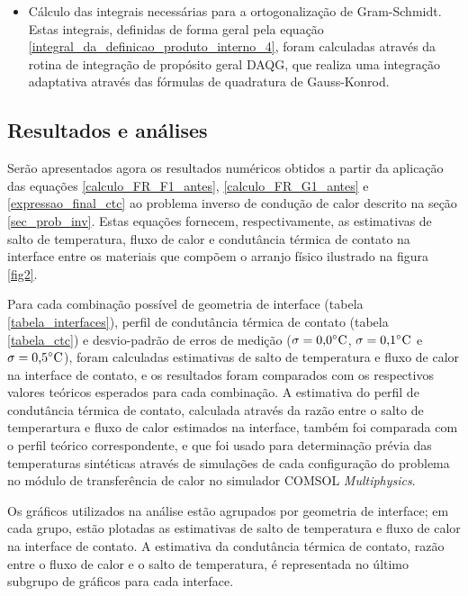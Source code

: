 \begin{itemize}
	\item Cálculo das integrais necessárias para a ortogonalização de Gram-Schmidt. Estas integrais, definidas de forma geral pela equação \eqref{integral_da_definicao_produto_interno_4}, foram calculadas através da rotina de integração de propósito geral DAQG, que realiza uma integração adaptativa através das fórmulas de quadratura de Gauss-Konrod.
\end{itemize}

\subsection{Resultados e análises}

Serão apresentados agora os resultados numéricos obtidos a partir da aplicação das equações \eqref{calculo_FR_F1_antes}, \eqref{calculo_FR_G1_antes} e \eqref{expressao_final_ctc} ao problema inverso de condução de calor descrito na seção \ref{sec_prob_inv}. Estas equações fornecem, respectivamente, as estimativas de salto de temperatura, fluxo de calor e condutância térmica de contato na interface entre os materiais que compõem o arranjo físico ilustrado na figura \ref{fig2}.

Para cada combinação possível de geometria de interface (tabela \ref{tabela_interfaces}), perfil de condutância térmica de contato (tabela \ref{tabela_ctc}) e desvio-padrão de erros de medição ($\sigma = \text{0,0}\celsius$, $\sigma = \text{0,1}\celsius$ e $\sigma = \text{0,5}\celsius$), foram calculadas estimativas de salto de temperatura e fluxo de calor na interface de contato, e os resultados foram comparados com os respectivos valores teóricos esperados para cada combinação. A estimativa do perfil de condutância térmica de contato, calculada através da razão entre o salto de temperartura e fluxo de calor estimados na interface, também foi comparada com o perfil teórico correspondente, e que foi usado para determinação prévia das temperaturas sintéticas através de simulações de cada configuração do problema no módulo de transferência de calor no simulador COMSOL \textit{Multiphysics}\textsuperscript{\textregistered}.

Os gráficos utilizados na análise estão agrupados por geometria de interface; em cada grupo, estão plotadas as estimativas de salto de temperatura e fluxo de calor na interface de contato. A estimativa da condutância térmica de contato, razão entre o fluxo de calor e o salto de temperatura, é representada no último subgrupo de gráficos para cada interface.

